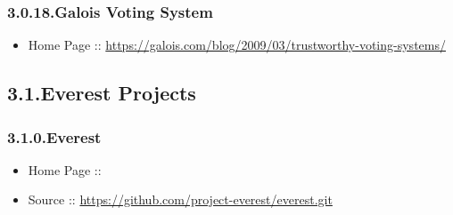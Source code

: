 \documentclass[12pt,twoside]{article}
\begin{document}
\subsubsection{3.0.18.\hspace*{0.5em}Galois Voting System}\label{sec-galois-voting-system}%

\begin{itemize}[noitemsep,topsep=\mdcompacttopsep]%

\item{}Home Page :: \href{https://galois.com/blog/2009/03/trustworthy-voting-systems/}{{\ttfamily https://\hspace{0pt}galois.\hspace{0pt}com/\hspace{0pt}blog/\hspace{0pt}2009/\hspace{0pt}03/\hspace{0pt}trustworthy-\hspace{0pt}voting-\hspace{0pt}systems/\hspace{0pt}}}%
\end{itemize}%

\subsection{3.1.\hspace*{0.5em}Everest Projects}\label{sec-everest-projects}%

\subsubsection{3.1.0.\hspace*{0.5em}Everest}\label{sec-everest}%

\begin{itemize}[noitemsep,topsep=\mdcompacttopsep]%

\item{}Home Page ::%

\item{}Source :: \href{https://github.com/project-everest/everest.git}{{\ttfamily https://\hspace{0pt}github.\hspace{0pt}com/\hspace{0pt}project-\hspace{0pt}everest/\hspace{0pt}everest.\hspace{0pt}git}}%
\end{itemize}%
\end{document}

